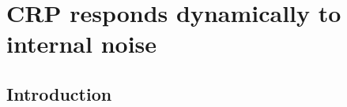 





% 
%
% 



\chapter{CRP responds dynamically to internal noise}
\label{chapter:CRP}

%
%
%

\section*{Introduction}



